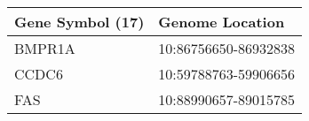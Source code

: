 \begin{tabular}{ll}
\toprule
Gene Symbol (17) &      Genome Location \\
\midrule
          BMPR1A & 10:86756650-86932838 \\
           CCDC6 & 10:59788763-59906656 \\
             FAS & 10:88990657-89015785 \\
\bottomrule
\end{tabular}
